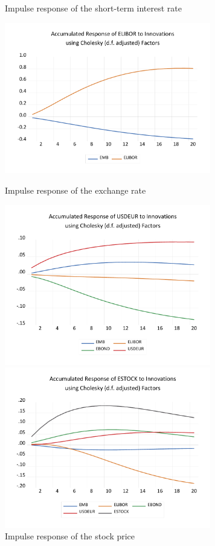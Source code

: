 \documentclass[12pt]{article}
\begin{document}
\begin{figure}[!htbp]
    \begin{minipage}{0.5\hsize}
        \caption{Impulse response of the short-term interest rate}
        \begin{center}
            \includegraphics[width=9cm]{ielibor.pdf}
        \end{center}
    \end{minipage}
    \begin{minipage}{0.5\hsize}
        \caption{Impulse response of the exchange rate}
        \begin{center}
            \includegraphics[width=9cm]{ierate.pdf}
        \end{center}
    \end{minipage}
    \begin{minipage}{0.5\hsize}
        \caption{Impulse response of the stock price}
        \begin{center}
            \includegraphics[width=9cm]{iestock.pdf}

\end{center}
\end{minipage}
\end{figure}
\end{document}
